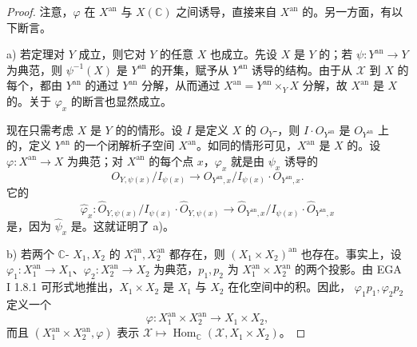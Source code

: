 \begin{proof}
注意，$\varphi$ 在 $X^{\mathrm{an}}$ 与 $X(\mathbb C)$ 之间诱导，直接来自 $X^{\mathrm{an}}$ 的。另一方面，有以下断言。

a) 若定理对 $Y$ 成立，则它对 $Y$ 的任意 $X$ 也成立。先设 $X$ 是 $Y$ 的；若 $\psi:Y^{\mathrm{an}}\to Y$ 为典范，则 $\psi^{-1}(X)$ 是 $Y^{\mathrm{an}}$ 的开集，赋予从 $Y^{\mathrm{an}}$ 诱导的结构。由于从 $\mathcal X$ 到 $X$ 的每个，都由 $Y^{\mathrm{an}}$ 的通过 $Y^{\mathrm{an}}$ 分解，从而通过 $X^{\mathrm{an}}=Y^{\mathrm{an}}\times_Y X$ 分解，故 $X^{\mathrm{an}}$ 是 $X$ 的。关于 $\varphi_x$ 的断言也显然成立。

现在只需考虑 $X$ 是 $Y$ 的的情形。设 $I$ 是定义 $X$ 的 $O_Y$-，则 $I\cdot O_{Y^{\mathrm{an}}}$ 是 $O_{Y^{\mathrm{an}}}$ 上的，定义 $Y^{\mathrm{an}}$ 的一个闭解析子空间 $X^{\mathrm{an}}$。如同的情形可见，$X^{\mathrm{an}}$ 是 $X$ 的。设 $\varphi:X^{\mathrm{an}}\to X$ 为典范；对 $X^{\mathrm{an}}$ 的每个点 $x$，$\varphi_x$ 就是由 $\psi_x$ 诱导的
\[
O_{Y,\psi(x)}/I_{\psi(x)}\longrightarrow
O_{Y^{\mathrm{an}},x}/I_{\psi(x)}\cdot O_{Y^{\mathrm{an}},x}.
\]
它的
\[
\widehat\varphi_x:
\widehat O_{Y,\psi(x)}/I_{\psi(x)}\cdot\widehat O_{Y,\psi(x)}
\longrightarrow
\widehat O_{Y^{\mathrm{an}},x}/I_{\psi(x)}\cdot\widehat O_{Y^{\mathrm{an}},x}
\]
是，因为 $\widehat\psi_x$ 是。这就证明了 a)。

b) 若两个 $\mathbb C$- $X_1,X_2$ 的 $X_1^{\mathrm{an}},X_2^{\mathrm{an}}$ 都存在，则 $(X_1\times X_2)^{\mathrm{an}}$ 也存在。事实上，设 $\varphi_1:X_1^{\mathrm{an}}\to X_1$、$\varphi_2:X_2^{\mathrm{an}}\to X_2$ 为典范，$p_1,p_2$ 为 $X_1^{\mathrm{an}}\times X_2^{\mathrm{an}}$ 的两个投影。由 EGA I 1.8.1 可形式地推出，$X_1\times X_2$ 是 $X_1$ 与 $X_2$ 在化空间中的积。因此， $\varphi_1p_1,\varphi_2p_2$ 定义一个
\[
\varphi:X_1^{\mathrm{an}}\times X_2^{\mathrm{an}}\longrightarrow X_1\times X_2,
\]
而且 $(X_1^{\mathrm{an}}\times X_2^{\mathrm{an}},\varphi)$ 表示 $\mathcal X\mapsto\operatorname{Hom}_{\mathbb C}(\mathcal X,X_1\times X_2)$。


\end{proof}
